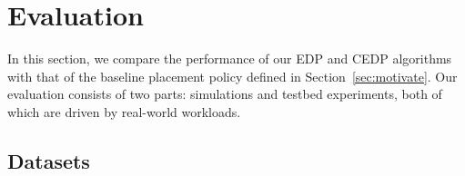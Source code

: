 \section{Evaluation}
\label{sec:evaluation}

In this section, we compare the performance of our EDP and CEDP algorithms
with that of the baseline placement policy defined in
Section~\ref{sec:motivate}.  Our evaluation consists of two parts: simulations
and testbed experiments, both of which are driven by real-world workloads. 




\subsection{Datasets}


